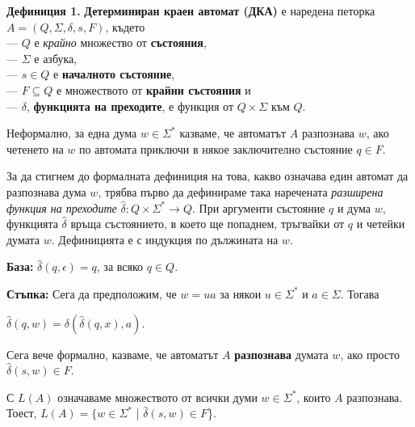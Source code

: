 \documentclass[openany]{book}
\begin{document}
    \vspace{15pt}

    \textbf{Дефиниция 1.} \textbf{Детерминиран краен автомат (ДКА)} е наредена петорка $A = (Q, \Sigma, \delta, s, F)$, където \\
    — $Q$ е \textit{крайно} множество от \textbf{състояния}, \\
    — $\Sigma$ е азбука, \\
    — $s \in Q$ е \textbf{началното състояние}, \\
    — $F \subseteq Q$ е множеството от \textbf{крайни състояния} и \\
    — $\delta$, \textbf{функцията на преходите}, е функция от $Q \times \Sigma$ към $Q$.

    \vspace{5pt}
    Неформално, за една дума $w \in \Sigma^*$ казваме, че автоматът $A$ разпознава $w$, ако четенето на $w$ по автомата приключи в някое заключително
    състояние $q \in F$.

    \vspace{5pt}

    За да стигнем до формалната дефиниция на това, какво означава един автомат да разпознава дума $w$,
    трябва първо да дефинираме така наречената \textit{разширена функция на преходите} $\hat{\delta}:Q \times \Sigma^* \rightarrow Q$. 
    При аргументи състояние $q$ и дума $w$, функцията $\hat{\delta}$ връща състоянието, в което ще попаднем,
    тръгвайки от $q$ и четейки думата $w$. Дефиницията е с индукция по дължината на $w$.

    \vspace{5pt}

    \textbf{База:} $\hat{\delta}(q,\epsilon) = q$, за всяко $q \in Q$.

    \vspace{5pt}

    \textbf{Стъпка:} Сега да предположим, че $w = ua$ за някои $u \in \Sigma^*$ и 
    $a \in \Sigma$. Тогава \\
    \begin{center}
        $\hat{\delta}(q,w) = \delta(\hat{\delta}(q,x),a)$.
    \end{center}

    \vspace{5pt}
    Сега вече формално, казваме, че автоматът $A$ \textbf{разпознава} думата $w$, ако просто
    $\hat{\delta}(s,w) \in F$.

    \vspace{5pt}
    С $L(A)$ означаваме множеството от всички думи $w \in \Sigma^*$, които $A$ разпознава.
    Тоест, $L(A) = \{w \in \Sigma^*$ | $\hat{\delta}(s,w) \in F$\}.
    \vspace{10pt}
\end{document}
